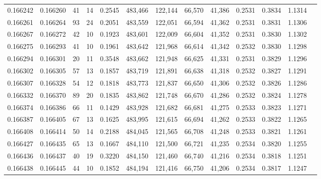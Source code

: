 \begin{tabular}{rrrrrrrrrrrrr}
0.166242 & 0.166260 &    41 &  14 &                                     0.2545 & 483,466 & 122,144 &  66,570 &  41,386 & 0.2531 & 0.3834 & 1.1314 \\
0.166261 & 0.166264 &    93 &  24 &                                     0.2051 & 483,559 & 122,051 &  66,594 &  41,362 & 0.2531 & 0.3831 & 1.1306 \\
0.166267 & 0.166272 &    42 &  10 &                                     0.1923 & 483,601 & 122,009 &  66,604 &  41,352 & 0.2531 & 0.3830 & 1.1302 \\
0.166275 & 0.166293 &    41 &  10 &                                     0.1961 & 483,642 & 121,968 &  66,614 &  41,342 & 0.2532 & 0.3830 & 1.1298 \\
0.166294 & 0.166301 &    20 &  11 &                                     0.3548 & 483,662 & 121,948 &  66,625 &  41,331 & 0.2531 & 0.3829 & 1.1296 \\
0.166302 & 0.166305 &    57 &  13 &                                     0.1857 & 483,719 & 121,891 &  66,638 &  41,318 & 0.2532 & 0.3827 & 1.1291 \\
0.166307 & 0.166328 &    54 &  12 &                                     0.1818 & 483,773 & 121,837 &  66,650 &  41,306 & 0.2532 & 0.3826 & 1.1286 \\
0.166332 & 0.166370 &    89 &  20 &                                     0.1835 & 483,862 & 121,748 &  66,670 &  41,286 & 0.2532 & 0.3824 & 1.1278 \\
0.166374 & 0.166386 &    66 &  11 &                                     0.1429 & 483,928 & 121,682 &  66,681 &  41,275 & 0.2533 & 0.3823 & 1.1271 \\
0.166387 & 0.166405 &    67 &  13 &                                     0.1625 & 483,995 & 121,615 &  66,694 &  41,262 & 0.2533 & 0.3822 & 1.1265 \\
0.166408 & 0.166414 &    50 &  14 &                                     0.2188 & 484,045 & 121,565 &  66,708 &  41,248 & 0.2533 & 0.3821 & 1.1261 \\
0.166427 & 0.166435 &    65 &  13 &                                     0.1667 & 484,110 & 121,500 &  66,721 &  41,235 & 0.2534 & 0.3820 & 1.1255 \\
0.166436 & 0.166437 &    40 &  19 &                                     0.3220 & 484,150 & 121,460 &  66,740 &  41,216 & 0.2534 & 0.3818 & 1.1251 \\
0.166438 & 0.166445 &    44 &  10 &                                     0.1852 & 484,194 & 121,416 &  66,750 &  41,206 & 0.2534 & 0.3817 & 1.1247 \\

\end{tabular}
